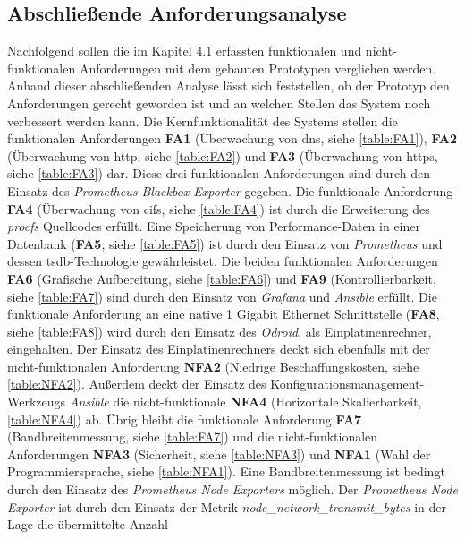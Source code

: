 \documentclass[titlepage]{report}
\begin{document}
\subsection{Abschließende Anforderungsanalyse}
Nachfolgend sollen die im Kapitel 4.1 erfassten funktionalen und
nicht\hyp{}funktionalen Anforderungen mit dem gebauten Prototypen verglichen
werden. Anhand dieser abschließenden Analyse lässt sich feststellen, ob
der Prototyp den Anforderungen gerecht geworden ist und an welchen
Stellen das System noch verbessert werden kann. Die Kernfunktionalität
des Systems stellen die funktionalen Anforderungen \textbf{FA1}
(Überwachung von \gls{dns}, siehe \autoref{table:FA1}), \textbf{FA2}
(Überwachung von \gls{http}, siehe \autoref{table:FA2}) und \textbf{FA3}
(Überwachung von \gls{https}, siehe \autoref{table:FA3}) dar. Diese drei
funktionalen Anforderungen sind durch den Einsatz des \emph{Prometheus
Blackbox Exporter} gegeben. Die funktionale Anforderung \textbf{FA4}
(Überwachung von \gls{cifs}, siehe \autoref{table:FA4}) ist durch die
Erweiterung des \emph{procfs} Quellcodes erfüllt. Eine Speicherung von
Performance\hyp{}Daten in einer Datenbank (\textbf{FA5}, siehe
\autoref{table:FA5}) ist durch den Einsatz von \emph{Prometheus} und
dessen \gls{tsdb}\hyp{}Technologie gewährleistet. Die beiden
funktionalen Anforderungen \textbf{FA6} (Grafische Aufbereitung, siehe
\autoref{table:FA6}) und \textbf{FA9} (Kontrollierbarkeit, siehe
\autoref{table:FA7}) sind durch den Einsatz von \emph{Grafana} und
\emph{Ansible} erfüllt. Die funktionale Anforderung an eine native 1
Gigabit Ethernet Schnittstelle (\textbf{FA8}, siehe \autoref{table:FA8})
wird durch den Einsatz des \emph{Odroid}, als Einplatinenrechner,
eingehalten. Der Einsatz des Einplatinenrechners deckt sich ebenfalls
mit der nicht\hyp{}funktionalen Anforderung \textbf{NFA2} (Niedrige
Beschaffungskosten, siehe \autoref{table:NFA2}). Außerdem deckt der
Einsatz des Konfigurationsmanagement\hyp{}Werkzeugs \emph{Ansible} die
nicht\hyp{}funktionale \textbf{NFA4} (Horizontale Skalierbarkeit,
\autoref{table:NFA4}) ab. Übrig bleibt die funktionale Anforderung
\textbf{FA7} (Bandbreitenmessung, siehe \autoref{table:FA7}) und die
nicht\hyp{}funktionalen Anforderungen \textbf{NFA3} (Sicherheit, siehe
\autoref{table:NFA3}) und \textbf{NFA1} (Wahl der Programmiersprache,
siehe \autoref{table:NFA1}). Eine Bandbreitenmessung ist bedingt durch
den Einsatz des \emph{Prometheus Node Exporters} möglich. Der
\emph{Prometheus Node Exporter} ist durch den Einsatz der Metrik
\emph{node\_network\_transmit\_bytes} in der Lage die übermittelte Anzahl
\end{document}
